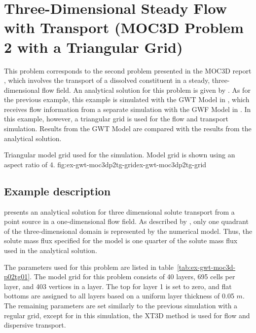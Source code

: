 \section{Three-Dimensional Steady Flow with Transport (MOC3D Problem 2 with a Triangular Grid)}

This problem corresponds to the second problem presented in the MOC3D report \cite{konikow1996three}, which involves the transport of a dissolved constituent in a steady, three-dimensional flow field.  An analytical solution for this problem is given by \cite{wexler1992}.  As for the previous example, this example is simulated with the GWT Model in \mf, which receives flow information from a separate simulation with the GWF Model in \mf.  In this example, however, a triangular grid is used for the flow and transport simulation.  Results from the GWT Model are compared with the results from the \cite{wexler1992} analytical solution.

\begin{StandardFigure}{
                                     Triangular model grid used for the \mf simulation.  Model grid is shown using an aspect ratio of 4.
                                     }{fig:ex-gwt-moc3dp2tg-grid}{ex-gwt-moc3dp2tg-grid}
\end{StandardFigure}            


\subsection{Example description}

\cite{wexler1992} presents an analytical solution for three dimensional solute transport from a point source in a one-dimensional flow field.  As described by \cite{konikow1996three}, only one quadrant of the three-dimensional domain is represented by the numerical model.  Thus, the solute mass flux specified for the model is one quarter of the solute mass flux used in the analytical solution.  

The parameters used for this problem are listed in table~\ref{tab:ex-gwt-moc3d-p02tg01}.  The model grid for this problem consists of 40 layers, 695 cells per layer, and 403 vertices in a layer.  The top for layer 1 is set to zero, and flat bottoms are assigned to all layers based on a uniform layer thickness of 0.05 $m$.  The remaining parameters are set similarly to the previous simulation with a regular grid, except for in this simulation, the XT3D method is used for flow and dispersive transport.

